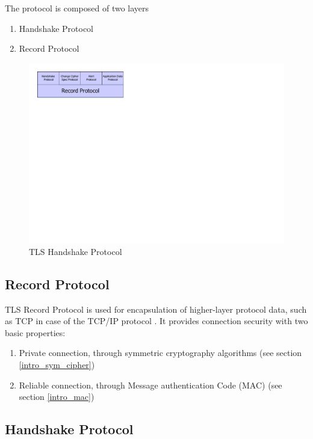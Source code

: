 The protocol is composed of two layers
\begin{enumerate}[noitemsep]
  \item Handshake Protocol
  \item Record Protocol
\end{enumerate}

\begin{figure}[!ht]
\centering
\includegraphics[trim=0cm 17cm 18cm 0cm]{figures/tls_handshake.pdf}
\caption{TLS Handshake Protocol}
\label{fig:tls_handshake}
\end{figure}

\subsection{Record Protocol}

TLS Record Protocol is used for encapsulation of higher-layer protocol data,
such as TCP in case of the TCP/IP protocol \cite{RFC0793}.
It provides connection security with two basic properties:
\begin{enumerate}[noitemsep]
  \item Private connection, through symmetric cryptography algorithms (see
  section \ref{intro_sym_cipher})
  \item Reliable connection, through Message authentication Code (MAC) (see
  section \ref{intro_mac}) 
\end{enumerate}

\subsection{Handshake Protocol}

